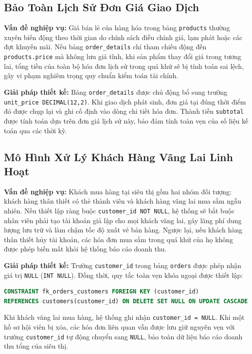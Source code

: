 \documentclass[12pt,a4paper]{report}
\begin{document}
\subsection{Bảo Toàn Lịch Sử Đơn Giá Giao Dịch}
\noindent\textbf{Vấn đề nghiệp vụ:} Giá bán lẻ của hàng hóa trong bảng \texttt{products} thường xuyên biến động theo thời gian do chính sách điều chỉnh giá, lạm phát hoặc các đợt khuyến mãi. Nếu bảng \texttt{order\_details} chỉ tham chiếu động đến \texttt{products.price} mà không lưu giá tĩnh, khi sản phẩm thay đổi giá trong tương lai, tổng tiền của toàn bộ hóa đơn lịch sử trong quá khứ sẽ bị tính toán sai lệch, gây vi phạm nghiêm trọng quy chuẩn kiểm toán tài chính.

\vspace{0.2cm}
\noindent\textbf{Giải pháp thiết kế:} Bảng \texttt{order\_details} được chủ động bổ sung trường \texttt{unit\_price DECIMAL(12,2)}. Khi giao dịch phát sinh, đơn giá tại đúng thời điểm đó được chụp lại và ghi cố định vào dòng chi tiết hóa đơn. Thành tiền \texttt{subtotal} được tính toán dựa trên đơn giá lịch sử này, bảo đảm tính toàn vẹn của số liệu kế toán qua các thời kỳ.

\subsection{Mô Hình Xử Lý Khách Hàng Vãng Lai Linh Hoạt}
\noindent\textbf{Vấn đề nghiệp vụ:} Khách mua hàng tại siêu thị gồm hai nhóm đối tượng: khách hàng thân thiết có thẻ thành viên và khách hàng vãng lai mua sắm ngẫu nhiên. Nếu thiết lập ràng buộc \texttt{customer\_id NOT NULL}, hệ thống sẽ bắt buộc nhân viên phải tạo tài khoản giả lập cho mọi khách vãng lai, gây lãng phí dung lượng lưu trữ và làm chậm tốc độ xuất vé bán hàng. Ngược lại, nếu khách hàng thân thiết hủy tài khoản, các hóa đơn mua sắm trong quá khứ của họ không được phép biến mất khỏi hệ thống báo cáo doanh thu.

\vspace{0.2cm}
\noindent\textbf{Giải pháp thiết kế:} Trường \texttt{customer\_id} trong bảng \texttt{orders} được phép nhận giá trị \texttt{NULL} (\texttt{INT NULL}). Đồng thời, quy tắc toàn vẹn khóa ngoại được thiết lập:
\begin{lstlisting}[language=SQL]
CONSTRAINT fk_orders_customers FOREIGN KEY (customer_id) 
REFERENCES customers(customer_id) ON DELETE SET NULL ON UPDATE CASCADE
\end{lstlisting}
Khi khách vãng lai mua hàng, hệ thống ghi nhận \texttt{customer\_id = NULL}. Khi một hồ sơ hội viên bị xóa, các hóa đơn liên quan vẫn được lưu giữ nguyên vẹn với trường \texttt{customer\_id} tự động chuyển sang \texttt{NULL}, bảo toàn dữ liệu báo cáo doanh thu tổng của siêu thị.
\end{document}
